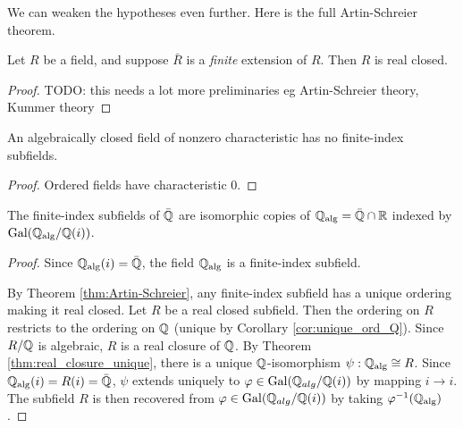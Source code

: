 We can weaken the hypotheses even further. Here is the full Artin-Schreier theorem.

\begin{theorem}
  \label{thm:Artin-Schreier}
  \leanok
  Let $R$ be a field, and suppose $\bar{R}$ is a \textit{finite} extension of $R$. Then $R$ is real closed.
\end{theorem}
\begin{proof}
  TODO: this needs a lot more preliminaries eg Artin-Schreier theory, Kummer theory
\end{proof}

\begin{corollary}
  \label{cor:ACF_char_p_no_fin_ind}
  An algebraically closed field of nonzero characteristic has no finite-index subfields.
\end{corollary}
\begin{proof}
  Ordered fields have characteristic 0.
\end{proof}

\begin{theorem}
  \label{thm:Q_alg_unique_fin_ind}
  The finite-index subfields of $\bar{\mathbb{Q}}$ are isomorphic copies of $\mathbb{Q}_{\text{alg}}=\bar{\mathbb{Q}}\cap\mathbb{R}$ indexed by $\operatorname{Gal}(\mathbb{Q}_{\text{alg}}/\mathbb{Q}(i))$.
\end{theorem}
\begin{proof}
  Since $\mathbb{Q}_{\text{alg}}(i)=\bar{\mathbb{Q}}$, the field $\mathbb{Q}_{\text{alg}}$ is a finite-index subfield.

  By Theorem \ref{thm:Artin-Schreier}, any finite-index subfield has a unique ordering making it real closed. Let $R$ be a real closed subfield. Then the ordering on $R$ restricts to the ordering on $\mathbb{Q}$ (unique by Corollary \ref{cor:unique_ord_Q}). Since $R/\mathbb{Q}$ is algebraic, $R$ is a real closure of $\mathbb{Q}$. By Theorem \ref{thm:real_closure_unique}, there is a unique $\mathbb{Q}$-isomorphism $\psi:\mathbb{Q}_{\text{alg}}\cong R$. Since $\mathbb{Q}_{\text{alg}}(i)=R(i)=\bar{\mathbb{Q}}$, $\psi$ extends uniquely to $\varphi\in\operatorname{Gal}(\mathbb{Q}_{alg}/\mathbb{Q}(i))$ by mapping $i\to i$. The subfield $R$ is then recovered from $\varphi\in\operatorname{Gal}(\mathbb{Q}_{alg}/\mathbb{Q}(i))$ by taking $\varphi^{-1}(\mathbb{Q}_{\text{alg}})$.
\end{proof}


